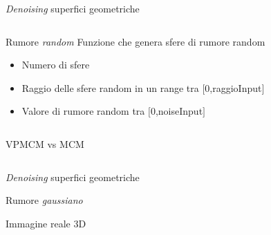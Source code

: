 \begin{frame}{\emph{Denoising} superfici geometriche}
  \begin{columns}[T]
    \begin{column}{4cm}
      \begin{block}{Rumore \emph{random}}
        Funzione che genera sfere di rumore random
        \begin{itemize}
        \item Numero di sfere
        \item Raggio delle sfere random in un range tra $[0$,raggioInput$]$ 
        \item Valore di rumore random tra $[0$,noiseInput$]$
        \end{itemize}
      \end{block}
    \end{column}
   \begin{column}{6cm}
   \end{column}
  \end{columns}
\end{frame}

\begin{frame}{VPMCM vs MCM}
\begin{columns}[T]
  \begin{column}{5cm}
    \centering
    \end{column}
  \begin{column}[T]{5cm}
    \centering
    \end{column}
 \end{columns}
\begin{columns}[T]
  \begin{column}{5cm}
    \centering
    \end{column}
  \begin{column}[T]{5cm}
    \centering
    \end{column}
  \end{columns}

\end{frame}

\begin{frame}{\emph{Denoising} superfici geometriche}
 \begin{block}{Rumore \emph{gaussiano}}

  \end{block}
\end{frame}

\begin{frame}{Immagine reale 3D}

\end{frame}
